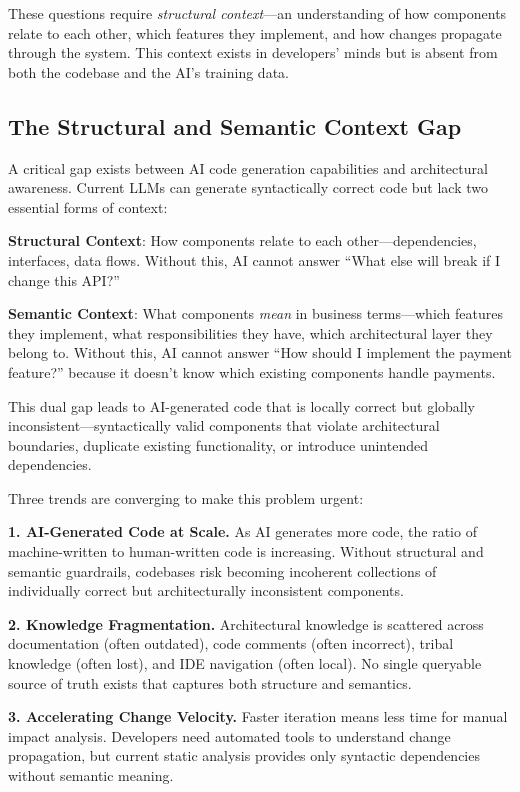 \documentclass[11pt,a4paper]{article}
\begin{document}
These questions require \emph{structural context}---an understanding of how components relate to each other, which features they implement, and how changes propagate through the system. This context exists in developers' minds but is absent from both the codebase and the AI's training data.

\subsection{The Structural and Semantic Context Gap}

A critical gap exists between AI code generation capabilities and architectural awareness. Current LLMs can generate syntactically correct code but lack two essential forms of context:

\textbf{Structural Context}: How components relate to each other---dependencies, interfaces, data flows. Without this, AI cannot answer ``What else will break if I change this API?''

\textbf{Semantic Context}: What components \emph{mean} in business terms---which features they implement, what responsibilities they have, which architectural layer they belong to. Without this, AI cannot answer ``How should I implement the payment feature?'' because it doesn't know which existing components handle payments.

This dual gap leads to AI-generated code that is locally correct but globally inconsistent---syntactically valid components that violate architectural boundaries, duplicate existing functionality, or introduce unintended dependencies.

Three trends are converging to make this problem urgent:

\textbf{1. AI-Generated Code at Scale.} As AI generates more code, the ratio of machine-written to human-written code is increasing. Without structural and semantic guardrails, codebases risk becoming incoherent collections of individually correct but architecturally inconsistent components.

\textbf{2. Knowledge Fragmentation.} Architectural knowledge is scattered across documentation (often outdated), code comments (often incorrect), tribal knowledge (often lost), and IDE navigation (often local). No single queryable source of truth exists that captures both structure and semantics.

\textbf{3. Accelerating Change Velocity.} Faster iteration means less time for manual impact analysis. Developers need automated tools to understand change propagation, but current static analysis provides only syntactic dependencies without semantic meaning.
\end{document}
